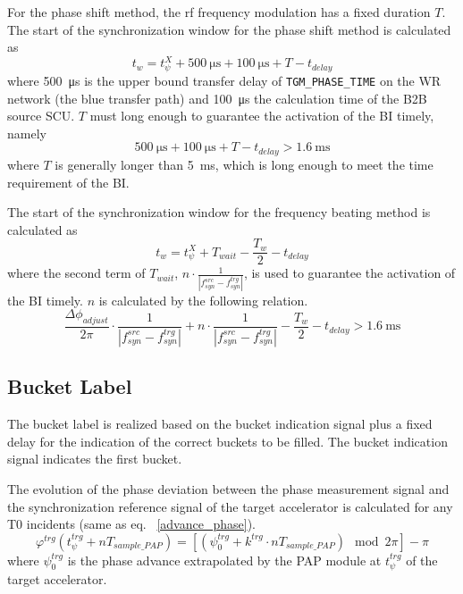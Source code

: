 For the phase shift method, the rf frequency modulation has a fixed duration $T$. The start of the synchronization window for the phase shift method is calculated as
\begin{equation}
t_\mathit{w}=t_\psi^\mathit{X}+\SI{500}{\us}+\SI{100}{\us}+T-t_\mathit{delay}\label{syn_win_start}
\end{equation}
where \SI{500}{\us} is the upper bound transfer delay of \verb|TGM_PHASE_TIME| on the WR network (the blue transfer path) and \SI{100}{\us} the calculation time of the B2B source SCU. $T$ must long enough to guarantee the activation of the BI timely, namely
\begin{equation}
\SI{500}{\us}+\SI{100}{\us}+T-t_\mathit{delay}> \SI{1.6}{\ms}
\end{equation}
where $T$ is generally longer than \SI{5}{\ms}, which is long enough to meet the time requirement of the BI. 

The start of the synchronization window for the frequency beating method is calculated as
\begin{equation}
t_\mathit{w}= t_\psi^\mathit{X}+T_\mathit{wait}-\frac{T_w}{2}-t_\mathit{delay}\label{syn_win_start1}
\end{equation}
where the second term of $T_\mathit{wait}$, $n\cdot \frac{1}{|f_{\mathit{syn}}^\mathit{src}-f_{\mathit{syn}}^\mathit{trg}|}$, is used to guarantee the activation of the BI timely. $n$ is calculated by the following relation.
\begin{equation}
\frac{\Delta \phi_\mathit{adjust}}{2\pi}\cdot\frac{1}{|f_{\mathit{syn}}^\mathit{src}-f_{\mathit{syn}}^\mathit{trg}|}+n\cdot \frac{1}{|f_{\mathit{syn}}^\mathit{src}-f_{\mathit{syn}}^\mathit{trg}|}-\frac{T_w}{2}-t_\mathit{delay}> \SI{1.6}{\ms}
\end{equation}


\subsection{Bucket Label}
\label{sec:bucket_label}
The bucket label is realized based on the bucket indication signal plus a fixed delay for the indication of the correct buckets to be filled. The bucket indication signal indicates the first bucket. 

The evolution of the phase deviation between the phase measurement signal and the synchronization reference signal of the target accelerator is calculated for any T0 incidents (same as eq. ~\ref{advance_phase}).
\begin{equation}
\varphi^\mathit{trg}(t_\mathit{\psi}^\mathit{trg}+nT_\mathit{sample\_PAP})=[(\psi^\mathit{trg}_0+k^\mathit{trg}\cdot nT_\mathit{sample\_PAP}) \mod 2\pi] - \pi
\end{equation}
where $\psi^\mathit{trg}_0$ is the phase advance extrapolated by the PAP module at $t_\mathit{\psi}^\mathit{trg}$ of the target accelerator.

